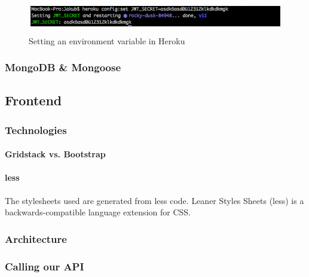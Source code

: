 \documentclass[11pt]{article}
\begin{document}
	\begin{figure}[H] 
		\centering 
		\includegraphics[height=1.4cm]{figures/herokuenvironmentvar}    
		\caption[Setting an environment variable in Heroku]{Setting an environment variable in Heroku}     
		\label{fig: Setting an environment variable in Heroku}     
	\end{figure}  


\subsubsection{MongoDB \& Mongoose}      
  

\subsection{Frontend}
\subsubsection{Technologies}
\paragraph{Gridstack vs. Bootstrap}
\paragraph{less}
The stylesheets used are generated from less code. 
Leaner Styles Sheets (less) is a backwards-compatible language extension for CSS. 

\subsubsection{Architecture}
\subsubsection{Calling our API}
 



\listoffigures
{}   
 
\listoftables
{} 
\cleardoublepage 


  
\end{document}
